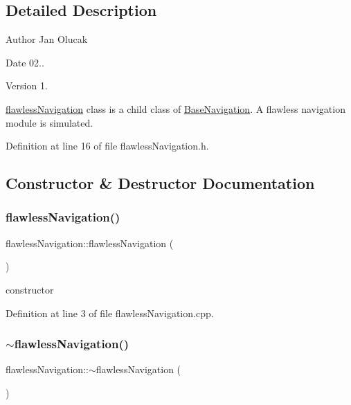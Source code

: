 \subsection{Detailed Description}
\begin{DoxyAuthor}{Author}
Jan Olucak 
\end{DoxyAuthor}
\begin{DoxyDate}{Date}
02.. 
\end{DoxyDate}
\begin{DoxyVersion}{Version}
1.
\end{DoxyVersion}
\hyperlink{classflawless_navigation}{flawless\+Navigation} class is a child class of \hyperlink{class_base_navigation}{Base\+Navigation}. A flawless navigation module is simulated. 

Definition at line 16 of file flawless\+Navigation.\+h.



\subsection{Constructor \& Destructor Documentation}
\mbox{\label{classflawless_navigation_aaccd796774558ce387216cc539a2eae6}} 
\subsubsection{\texorpdfstring{flawless\+Navigation()}{flawlessNavigation()}}
{\footnotesize\ttfamily flawless\+Navigation\+::flawless\+Navigation (\begin{DoxyParamCaption}{ }\end{DoxyParamCaption})}



constructor 



Definition at line 3 of file flawless\+Navigation.\+cpp.

\mbox{\label{classflawless_navigation_af9c6489e6dc05dc5f61646d768de02c0}} 
\subsubsection{\texorpdfstring{$\sim$flawless\+Navigation()}{~flawlessNavigation()}}
{\footnotesize\ttfamily flawless\+Navigation\+::$\sim$flawless\+Navigation (\begin{DoxyParamCaption}{ }\end{DoxyParamCaption})}



